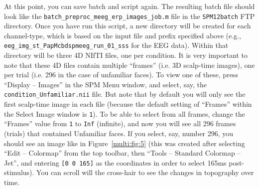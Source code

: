 At this point, you can save batch and script again. The resulting batch file should look like the \texttt{batch\_preproc\_meeg\_erp\_images\_job.m} file in the \texttt{SPM12batch} FTP directory. Once you have run this script, a new directory will be created for each channel-type, which is based on the input file and prefix specified above (e.g., \texttt{eeg\_img\_st\_PapMcbdspmeeg\_run\_01\_sss} for the EEG data). Within that directory will be three 4D NIfTI files, one per condition. It is very important to note that these 4D files contain multiple ``frames'' (i.e. 3D scalp-time images), one per trial (i.e. 296 in the case of unfamiliar faces). To view one of these, press ``Display -- Images'' in the SPM Menu window, and select, say, the \texttt{condition\_Unfamiliar.nii} file. But note that by default you will only see the first scalp-time image in each file (because the default setting of ``Frames'' within the Select Image window is \texttt{1}). To be able to select from all frames, change the ``Frames'' value from \texttt{1} to \texttt{Inf} (infinite), and now you will see all 296 frames (trials) that contained Unfamiliar faces. If you select, say, number 296, you should see an image like in Figure~\ref{multi:fig:5} (this was created after selecting ``Edit -- Colormap'' from the top toolbar, then ``Tools -- Standard Colormap -- Jet'', and entering \verb|[0 0 165]| as the coordinates in order to select 165ms post-stimulus). You can scroll will the cross-hair to see the changes in topography over time.

